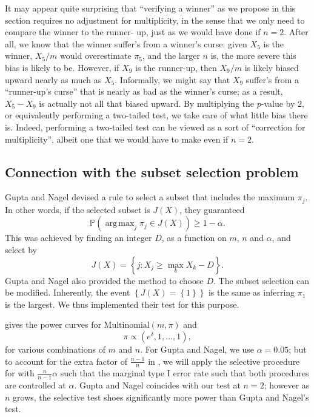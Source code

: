 \documentclass[11pt]{article}
\DeclareMathOperator*{\argmax}{arg\,max}
\newcommand{\PP}{\mathbb{P}}
\begin{document}
It may appear quite surprising that ``verifying a winner'' as we propose in this section requires no adjustment for multiplicity, in the sense that we only need to compare the winner to the runner- up, just as we would have done if $n = 2$. After all, we know that the winner suffer’s from a winner's curse: given $X_5$ is the winner, $X_5 / m$ would overestimate $\pi_5$, and the larger $n$ is, the more severe this bias is likely to be. However, if $X_9$ is the runner-up, then $X_9 / m$ is likely biased upward nearly as much as $X_5$. Informally, we might say that $X_9$ suffer’s from a “runner-up’s curse” that is nearly as bad as the winner's curse; as a result, $X_5 - X_9$ is actually not all that biased upward. By multiplying the $p$-value by $2$, or equivalently performing a two-tailed test, we take care of what little bias there is. Indeed, performing a two-tailed test can be viewed as a sort of ``correction for multiplicity'', albeit one that we would have to make even if $n = 2$.

\subsection{Connection with the subset selection problem}
\label{sec:compare_subset}

Gupta and Nagel \cite{Gupta:1967wg} devised a rule to select a subset that includes the maximum $\pi_j$. In other words, if the selected subset is $J\left(X\right)$, they guaranteed
$$\PP\left(\argmax_j \pi_j \in J\left(X\right)\right) \ge 1 - \alpha.$$
This was achieved by finding an integer $D$, as a function on $m$, $n$ and $\alpha$, and select by
$$J\left(X\right) = \left\{j: X_j \ge \max_k X_k - D\right\}.$$
Gupta and Nagel also provided the method to choose $D$. The subset selection can be modified. Inherently, the event $\left\{J\left(X\right) = \left\{1\right\}\right\}$ is the same as inferring $\pi_1$ is the largest. We thus implemented their test for this purpose.

 gives the power curves for $\text{Multinomial}\left(m, \pi\right)$ and
$$\pi \propto \left(e^\delta, 1, \ldots, 1\right),$$
for various combinations of $m$ and $n$. For Gupta and Nagel, we use $\alpha = 0.05$; but to account for the extra factor of $\frac{n-1}{n}$ in , we will apply the selective procedure for with $\frac{n}{n-1} \alpha$ such that the marginal type I error rate such that both procedures are controlled at $\alpha$. Gupta and Nagel coincides with our test at $n = 2$; however as $n$ grows, the selective test shoes significantly more power than Gupta and Nagel's test.
\end{document}
